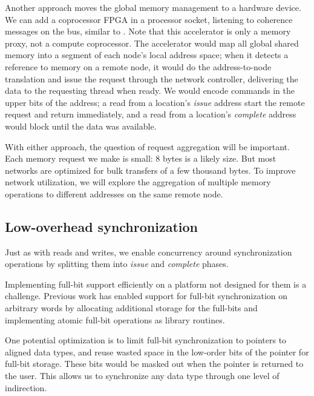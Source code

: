 \documentclass[10pt,nocopyrightspace,preprint]{sigplanconf}
\begin{document}
Another approach moves the global memory management to a hardware
device. We can add a coprocessor FPGA in a processor socket, listening
to coherence messages on the bus, similar to \cite{mogill}. Note that
this accelerator is only a memory proxy, not a compute
coprocessor. The accelerator would map all global shared memory into a
segment of each node's local address space; when it detects a
reference to memory on a remote node, it would do the address-to-node
translation and issue the request through the network controller,
delivering the data to the requesting thread when ready. We would
encode commands in the upper bits of the address; a read from a
location's {\em issue} address start the remote request and return
immediately, and a read from a location's {\em complete} address would
block until the data was available.



With either approach, the question of request aggregation will be
important. Each memory request we make is small: 8 bytes is a likely
size. But most networks are optimized for bulk transfers of a few
thousand bytes. To improve network utilization, we will explore the
aggregation of multiple memory operations to different addresses on
the same remote node. 


\subsection{Low-overhead synchronization}

Just as with reads and writes, we enable concurrency around
synchronization operations by splitting them into {\em issue} and {\em
  complete} phases.

Implementing full-bit support efficiently on a platform not
designed for them is a challenge. Previous work \cite{qthreads} has
enabled support for full-bit synchronization on arbitrary words by
allocating additional storage for the full-bits and implementing
atomic full-bit operations as library routines.

One potential optimization is to limit full-bit synchronization to
pointers to aligned data types, and reuse wasted space in the
low-order bits of the pointer for full-bit storage. These bits
would be masked out when the pointer is returned to the user.  This
allows us to synchronize any data type through one level of
indirection.
\end{document}

